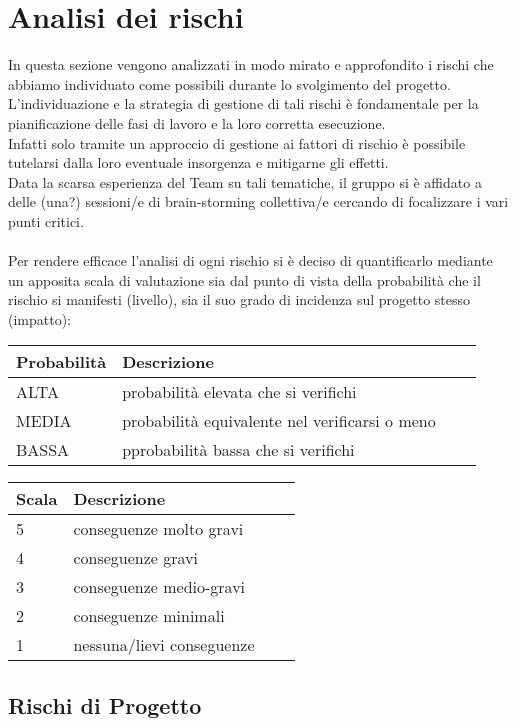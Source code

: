 \section{Analisi dei rischi}
In questa sezione vengono analizzati in modo mirato e approfondito i rischi che abbiamo individuato come possibili durante lo svolgimento del progetto. L'individuazione e la strategia di gestione di tali rischi è fondamentale per la pianificazione delle fasi di lavoro e la loro corretta esecuzione.\\
Infatti solo tramite un approccio di gestione ai fattori di rischio è possibile tutelarsi dalla loro eventuale insorgenza e mitigarne gli effetti.\\
Data la scarsa esperienza del Team su tali tematiche, il gruppo si è affidato a delle (una?) sessioni/e di brain-storming collettiva/e cercando di focalizzare i vari punti critici. \\\\
Per rendere efficace l'analisi di ogni rischio si è deciso di quantificarlo mediante un apposita scala di valutazione sia dal punto di vista della probabilità che il rischio si manifesti (livello), sia il suo grado di incidenza sul progetto stesso (impatto):

\begin{tabularx}{\textwidth}{lXll}
\toprule
Probabilità & Descrizione\\
\midrule
ALTA & probabilità elevata che si verifichi\\
MEDIA & probabilità equivalente nel verificarsi o meno\\
BASSA & pprobabilità bassa che si verifichi\\
\bottomrule
\end{tabularx}

\begin{tabularx}{\textwidth}{lXll}
\toprule
Scala & Descrizione\\
\midrule
5 & conseguenze molto gravi\\
4 & conseguenze gravi\\
3 & conseguenze medio-gravi\\
2 & conseguenze minimali\\
1 & nessuna/lievi conseguenze\\
\bottomrule
\end{tabularx}

\subsection{Rischi di Progetto}
